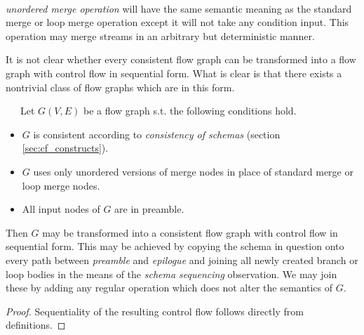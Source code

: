 \begin{define} \ \ \ 
\begin{description}
  \item \emph{unordered merge operation} will have the same semantic meaning as the standard merge or loop merge operation except it will not take any condition input. This operation may merge streams in an arbitrary but deterministic manner.
\end{description}
\end{define}

It is not clear whether every consistent flow graph can be transformed into a flow graph with control flow in sequential form. What is clear is that there exists a nontrivial class of flow graphs which are in this form.

\begin{observation} \ \ \ 
  Let $G(V,E)$ be a flow graph s.t. the following conditions hold.
  \begin{itemize}
    \item $G$ is consistent according to \emph{consistency of schemas} (section \ref{sec:cf_constructs}).
    \item $G$ uses only unordered versions of merge nodes in place of standard merge or loop merge nodes.
    \item All input nodes of $G$ are in preamble.
  \end {itemize} 
  Then $G$ may be transformed into a consistent flow graph with control flow in sequential form. This may be achieved by copying the schema in question onto every path between \emph{preamble} and \emph{epilogue} and joining all newly created branch or loop bodies in the means of the \emph{schema sequencing} observation. We may join these by adding any regular operation which does not alter the semantics of $G$.
  \begin{proof} 
  Sequentiality of the resulting control flow follows directly from definitions.
  \end{proof}
\end{observation}

